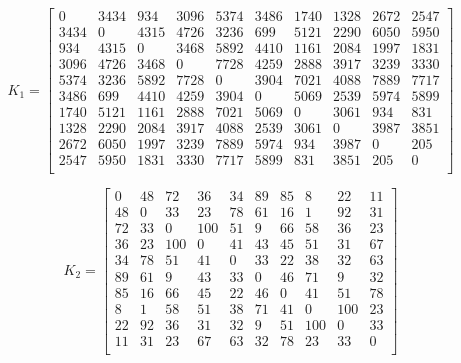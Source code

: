 \begin{equation}
	\label{eq:kd1}
	K_{1} =\begin{bmatrix}
	 0 & 3434 & 934 & 3096 & 5374 & 3486 & 1740 & 1328 & 2672 & 2547 \\
		3434 & 0 & 4315 & 4726 & 3236 & 699 & 5121 & 2290 & 6050 & 5950 \\
		934 & 4315 & 0 & 3468 & 5892 & 4410 & 1161 & 2084 & 1997 & 1831 \\
		3096 & 4726 & 3468 & 0 & 7728 & 4259 & 2888 & 3917 & 3239 & 3330 \\
		5374 & 3236 & 5892 & 7728 & 0 & 3904 & 7021 & 4088 & 7889 & 7717 \\
		3486 & 699 & 4410 & 4259 & 3904 & 0 & 5069 & 2539 & 5974 & 5899 \\
		1740 & 5121 & 1161 & 2888 & 7021 & 5069 & 0 & 3061 & 934 & 831 \\
		1328 & 2290 & 2084 & 3917 & 4088 & 2539 & 3061 & 0 & 3987 & 3851 \\
		2672 & 6050 & 1997 & 3239 & 7889 & 5974 & 934 & 3987 & 0 & 205 \\
		2547 & 5950 & 1831 & 3330 & 7717 & 5899 & 831 & 3851 & 205 & 0 \\
	\end{bmatrix}
\end{equation}

\begin{equation}
	\label{eq:kd2}
K_{2} = \begin{bmatrix}
	0 & 48 & 72 & 36 & 34 & 89 & 85 & 8 & 22 & 11 \\
	48 & 0 & 33 & 23 & 78 & 61 & 16 & 1 & 92 & 31 \\
	72 & 33 & 0 & 100 & 51 & 9 & 66 & 58 & 36 & 23 \\
	36 & 23 & 100 & 0 & 41 & 43 & 45 & 51 & 31 & 67 \\
	34 & 78 & 51 & 41 & 0 & 33 & 22 & 38 & 32 & 63 \\
	89 & 61 & 9 & 43 & 33 & 0 & 46 & 71 & 9 & 32 \\
	85 & 16 & 66 & 45 & 22 & 46 & 0 & 41 & 51 & 78 \\
	8 & 1 & 58 & 51 & 38 & 71 & 41 & 0 & 100 & 23 \\
	22 & 92 & 36 & 31 & 32 & 9 & 51 & 100 & 0 & 33 \\
	11 & 31 & 23 & 67 & 63 & 32 & 78 & 23 & 33 & 0 \\
\end{bmatrix}
\end{equation}

